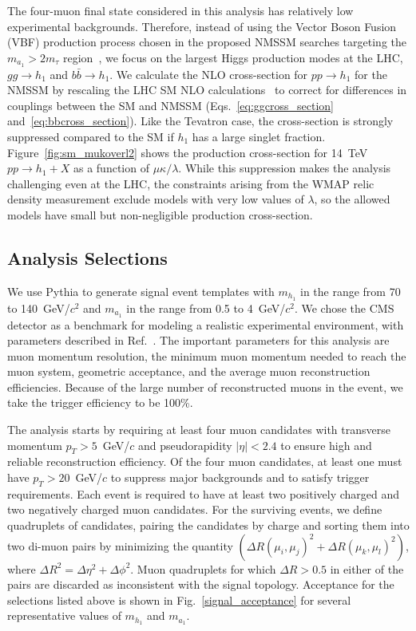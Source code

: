 \documentclass[aps,prl,twocolumn,nofootinbib,superscriptaddress]{revtex4}
\begin{document}
The four-muon final state considered in this analysis has relatively
low experimental backgrounds.  Therefore, instead of using the Vector
Boson Fusion (VBF) production process chosen in the proposed NMSSM
searches targeting the $m_{a_1} > 2m_\tau$ region~\cite{nmssm-ph7}, we
focus on the largest Higgs production modes at the LHC, $gg \to h_1$
and $b\bar{b} \to h_1$.  We calculate the NLO cross-section for $pp
\to h_1$ for the NMSSM by rescaling the LHC SM NLO
calculations~\cite{Spira:1995rr,Balazs:1998sb} to correct for
differences in couplings between the SM and NMSSM
(Eqs.~\ref{eq:ggcross_section} and~\ref{eq:bbcross_section}).  Like
the Tevatron case, the cross-section is strongly suppressed compared
to the SM if $h_1$ has a large singlet fraction.
Figure~\ref{fig:sm_mukoverl2} shows the production cross-section for
14~TeV $pp \to h_1+X$ as a function of $\mu\kappa/\lambda$.  While
this suppression makes the analysis challenging even at the LHC, the
constraints arising from the WMAP relic density measurement exclude
models with very low values of $\lambda$, so the allowed models have
small but non-negligible production cross-section.

\subsection{Analysis Selections}

We use Pythia to generate signal event templates with $m_{h_1}$ in the
range from 70 to 140~GeV/$c^2$ and $m_{a_1}$ in the range from 0.5 to
4~GeV/$c^2$.  We chose the CMS detector as a benchmark for modeling a
realistic experimental environment, with parameters described in
Ref.~\cite{cms-tdr}.  The important parameters for this analysis are
muon momentum resolution, the minimum muon momentum needed to reach
the muon system, geometric acceptance, and the average muon
reconstruction efficiencies.  Because of the large number of
reconstructed muons in the event, we take the trigger efficiency to be
100\%.

The analysis starts by requiring at least four muon candidates with
transverse momentum $p_T > 5$~GeV/$c$ and pseudorapidity $|\eta| <
2.4$ to ensure high and reliable reconstruction efficiency.  Of the
four muon candidates, at least one must have $p_T > 20$~GeV/$c$ to
suppress major backgrounds and to satisfy trigger requirements.  Each
event is required to have at least two positively charged and two
negatively charged muon candidates.  For the surviving events, we
define quadruplets of candidates, pairing the candidates by charge and
sorting them into two di-muon pairs by minimizing the quantity
$(\Delta R(\mu_i,\mu_j)^2 + \Delta R (\mu_k,\mu_l)^2)$, where $\Delta
R^2 = \Delta \eta^2 + \Delta \phi^2$.  Muon quadruplets for which
$\Delta R > 0.5$ in either of the pairs are discarded as inconsistent
with the signal topology.  Acceptance for the selections listed above
is shown in Fig.~\ref{signal_acceptance} for several representative
values of $m_{h_1}$ and $m_{a_1}$.
\end{document}
